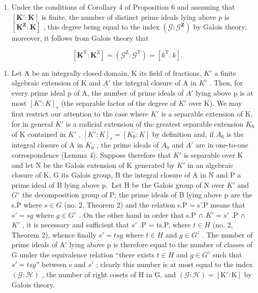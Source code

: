 \begin{enumerate}
\def\labelenumi{(\arabic{enumi})}
\setcounter{enumi}{2}
\tightlist
\item
  Under the conditions of Corollary 4 of Proposition 6 and assuming that \([\mathbf{K}':\mathbf{K}]\) is finite, the number of distinct prime ideals lying above \(p\) is \([\mathbf{K}^{\mathbf{Z}}:\mathbf{K}]\) , this degree being equal to the index \((\mathcal{G}:\mathcal{G}^{\mathbf{Z}})\) by Galois theory; moreover, it follows from Galois theory that
\end{enumerate}

\[
[ \mathbf {K} ^ {\mathrm{T}}: \mathbf {K} ^ {\mathrm{Z}} ] = (\mathcal {G} ^ {\mathrm{Z}}: \mathcal {G} ^ {\mathrm{T}}) = [ k ^ {\mathrm{T}}: k ].\tag{6}
\]

\begin{enumerate}
\def\labelenumi{(\arabic{enumi})}
\setcounter{enumi}{3}
\tightlist
\item
  Let A be an integrally closed domain, K its field of fractions, \(K'\) a finite algebraic extension of K and \(A'\) the integral closure of A in \(K'\) . Then, for every prime ideal p of A, the number of prime ideals of \(A'\) lying above p is at most \([K':K]_{s}\) (the separable factor of the degree of \(K'\) over K). We may first restrict our attention to the case where \(K'\) is a separable extension of K, for in general \(K'\) is a radicial extension of the greatest separable extension \(K_{0}\) of K contained in \(K'\) , \([K':K]_{s} = [K_{0}:K]\) by definition and, if \(A_{0}\) is the integral closure of A in \(K_{0}\) , the prime ideals of \(A_{0}\) and \(A'\) are in one-to-one correspondence (Lemma 4). Suppose therefore that \(K'\) is separable over K and let N be the Galois extension of K generated by \(K'\) in an algebraic closure of K, G its Galois group, B the integral closure of A in N and P a prime ideal of B lying above p.~Let H be the Galois group of N over \(K'\) and \(G^{z}\) the decomposition group of P; the prime ideals of B lying above p are the s.P where \(s \in G\) (no. 2, Theorem 2) and the relation s.P = s'.P means that \(s' = sg\) where \(g \in G^{z}\) . On the other hand in order that s.P ∩ \(K' = s'\) .P ∩ \(K'\) , it is necessary and sufficient that \(s'\) .P = ts.P, where \(t \in H\) (no. 2, Theorem 2), whence finally \(s' = tsg\) where \(t \in H\) and \(g \in G^{z}\) . The number of prime ideals of A' lying above p is therefore equal to the number of classes of G under the equivalence relation ``there exists \(t \in H\) and \(g \in G^{z}\) such that \(s' = tsg\)'' between s and \(s'\) ; clearly this number is at most equal to the index \((\mathcal{G}:\mathcal{H})\) , the number of right cosets of H in G, and \((\mathcal{G}:\mathcal{H}) = [\mathrm{K}':\mathrm{K}]\) by Galois theory.
\end{enumerate}

